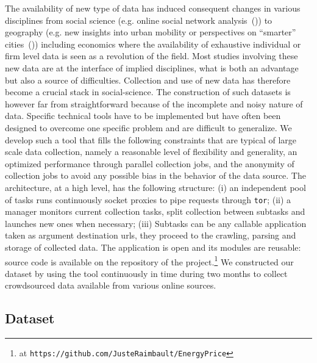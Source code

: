 \documentclass[3p,times,procedia]{elsarticle}
\begin{document}
The availability of new type of data has induced consequent changes in various disciplines from social science (e.g. online social network analysis~(\cite{tan2013social})) to geography (e.g. new insights into urban mobility or perspectives on ``smarter'' cities~(\cite{batty2013big})) including economics where the availability of exhaustive individual or firm level data is seen as a revolution of the field. Most studies involving these new data are at the interface of implied disciplines, what is both an advantage but also a source of difficulties. %
 Collection and use of new data has therefore become a crucial stack in social-science. The construction of such datasets is however far from straightforward because of the incomplete and noisy nature of data. Specific technical tools have to be implemented but have often been designed to overcome one specific problem and are difficult to generalize. We develop such a tool that fills the following constraints that are typical of large scale data collection, namely a reasonable level of flexibility and generality, an optimized performance through parallel collection jobs, and the anonymity of collection jobs to avoid any possible bias in the behavior of the data source. The architecture, at a high level, has the following structure: (i) an independent pool of tasks runs continuously socket proxies to pipe requests through \texttt{tor}; (ii) a manager monitors current collection tasks, split collection between subtasks and launches new ones when necessary; (iii) Subtasks can be any callable application taken as argument destination urls, they proceed to the crawling, parsing and storage of collected data. The application is open and its modules are reusable: source code is available on the repository of the project.\footnote{at \texttt{https://github.com/JusteRaimbault/EnergyPrice}} We constructed our dataset by using the tool continuously in time during two months to collect crowdsourced data available from various online sources.


\subsection{Dataset}
\end{document}
